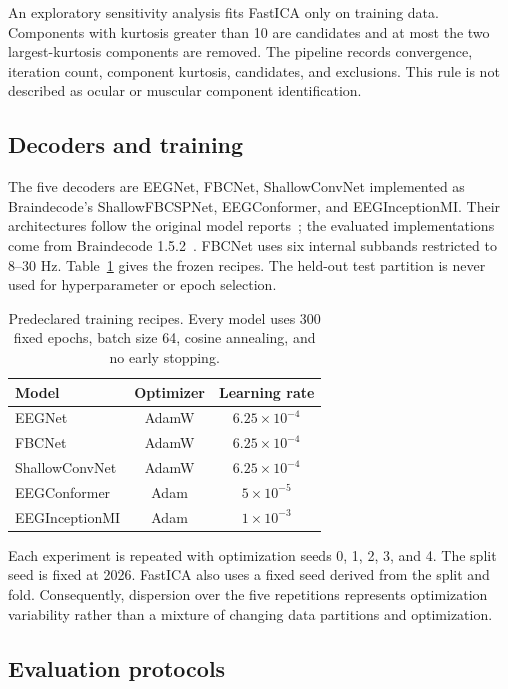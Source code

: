 \documentclass[conference]{IEEEtran}
\begin{document}
An exploratory sensitivity analysis fits FastICA only on training data. Components with kurtosis
greater than 10 are candidates and at most the two largest-kurtosis components are removed. The
pipeline records convergence, iteration count, component kurtosis, candidates, and exclusions.
This rule is not described as ocular or muscular component identification.

\subsection{Decoders and training}

The five decoders are EEGNet, FBCNet, ShallowConvNet implemented as Braindecode's
ShallowFBCSPNet, EEGConformer, and EEGInceptionMI. Their architectures follow the original model
reports~\cite{eegnet,fbcnet,shallow,conformer,eeginception}; the evaluated implementations come
from Braindecode 1.5.2~\cite{braindecode}. FBCNet uses six internal subbands restricted to
8--30 Hz. Table~\ref{tab:recipes} gives the frozen recipes. The held-out test partition is never
used for hyperparameter or epoch selection.

\begin{table}[t]
\caption{Predeclared training recipes. Every model uses 300 fixed epochs, batch size 64,
cosine annealing, and no early stopping.}
\label{tab:recipes}
\centering
\begin{tabular}{lcc}
\toprule
Model & Optimizer & Learning rate \\
\midrule
EEGNet & AdamW & $6.25\times10^{-4}$ \\
FBCNet & AdamW & $6.25\times10^{-4}$ \\
ShallowConvNet & AdamW & $6.25\times10^{-4}$ \\
EEGConformer & Adam & $5\times10^{-5}$ \\
EEGInceptionMI & Adam & $1\times10^{-3}$ \\
\bottomrule
\end{tabular}
\end{table}

Each experiment is repeated with optimization seeds 0, 1, 2, 3, and 4. The split seed is fixed at
2026. FastICA also uses a fixed seed derived from the split and fold. Consequently, dispersion over
the five repetitions represents optimization variability rather than a mixture of changing data
partitions and optimization.

\subsection{Evaluation protocols}
\end{document}

